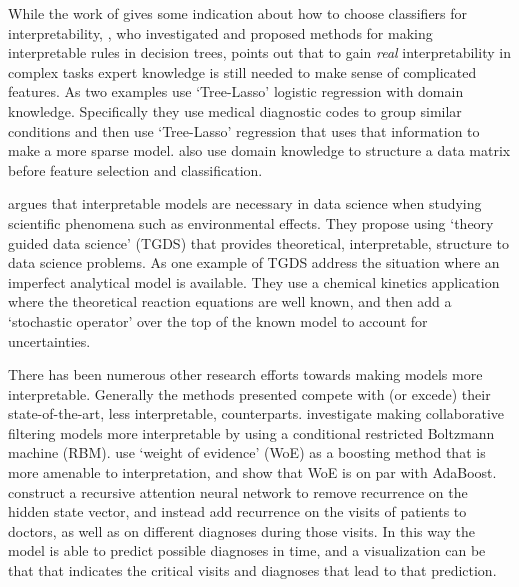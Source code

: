     While the work of \citeauthor{Huysmans2011-th} gives some indication about how to choose classifiers for interpretability, \citeauthor{Park2016-ld}, who investigated and proposed methods for making interpretable rules in decision trees, points out that to gain \emph{real} interpretability in complex tasks expert knowledge is still needed to make sense of complicated features. As two examples \citet{Jovanovic2016-gw} use `Tree-Lasso' logistic regression with domain knowledge. Specifically they use medical diagnostic codes to group similar conditions and then use `Tree-Lasso' regression that uses that information to make a more sparse model. \citet{Zycinski2012-jj} also use domain knowledge to structure a data matrix before feature selection and classification. 
    
    \citet{Faghmous2014-og} argues that interpretable models are necessary in data science when studying scientific phenomena such as environmental effects. They propose using `theory guided data science' (TGDS) that provides theoretical, interpretable, structure to data science problems. As one example of TGDS \citet{Morrison2016-fz} address the situation where an imperfect analytical model is available. They use a chemical kinetics application where the theoretical reaction equations are well known, and then add a `stochastic operator' over the top of the known model to account for uncertainties.
    
    There has been numerous other research efforts towards making models more interpretable. Generally the methods presented compete with (or excede) their state-of-the-art, less interpretable, counterparts. \citet{Abdollahi2016-vn} investigate making collaborative filtering models more interpretable by using a conditional restricted Boltzmann machine (RBM). \citet{Ridgeway1998-lv} use `weight of evidence' (WoE) as a boosting method that is more amenable to interpretation, and show that WoE is on par with AdaBoost. \citet{Choi2016-by} construct a recursive attention neural network to remove recurrence on the hidden state vector, and instead add recurrence on the visits of patients to doctors, as well as on different diagnoses during those visits. In this way the model is able to predict possible diagnoses in time, and a visualization can be that that indicates the critical visits and diagnoses that lead to that prediction.  

